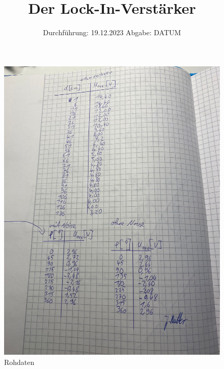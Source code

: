 

\subject{V303}
\title{Der Lock-In-Verstärker}
\date{%
  Durchführung: 19.12.2023
  \hspace{3em}
  Abgabe: DATUM
}



\maketitle
\thispagestyle{empty}
\tableofcontents
\newpage






\printbibliography{}


\begin{figure}[H]
  \caption{Rohdaten}
  \includegraphics[width=\textwidth]{Bilder/data.jpg}
\end{figure}



